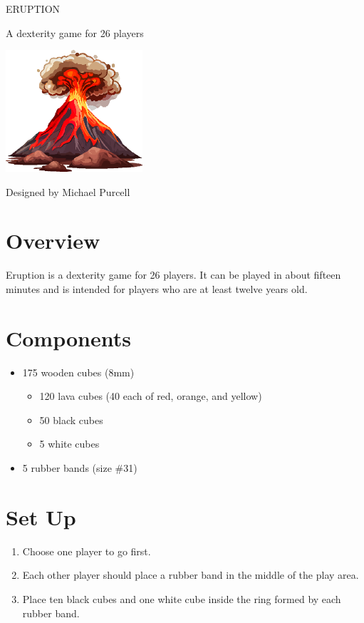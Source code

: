 \documentclass[parskip=half]{scrartcl}
\begin{document}
\color{eruption_purple}
{
\enlargethispage{1.0\baselineskip}
\begin{center}
\setmainfont[Scale=1.0]{Earthquake MF} \Huge
ERUPTION

\setmainfont{URWClassico} \scriptsize
A dexterity game for 2\textendash{}6 players

\vfill

\includegraphics[width=2.0in]{Images/one_volcano.png}

\vfill

\setmainfont{URWClassico}
\normalsize
Designed by Michael Purcell
\end{center}
}

\newpage
\raggedright
\setmainfont{URWClassico} \small
\section*{Overview}
Eruption is a dexterity game for 2\textendash{}6 players. It can be played in about fifteen minutes and is intended for players who are at least twelve years old.

\section*{Components}
\begin{itemize}[leftmargin=*]
\item 175 wooden cubes (8mm)
\begin{itemize}[leftmargin=*]
\item 120 lava cubes (40 each of red, orange, and yellow)
\item 50 black cubes
\item 5 white cubes
\end{itemize}
\item 5 rubber bands (size \#31)
\end{itemize}

\newpage

\section*{Set Up}
\begin{enumerate}[leftmargin=*]
\item Choose one player to go first.

\item Each other player should place a rubber band in the middle of the play area.

\item Place ten black cubes and one white cube inside the ring formed by each rubber band.
\end{enumerate}
\end{document}
